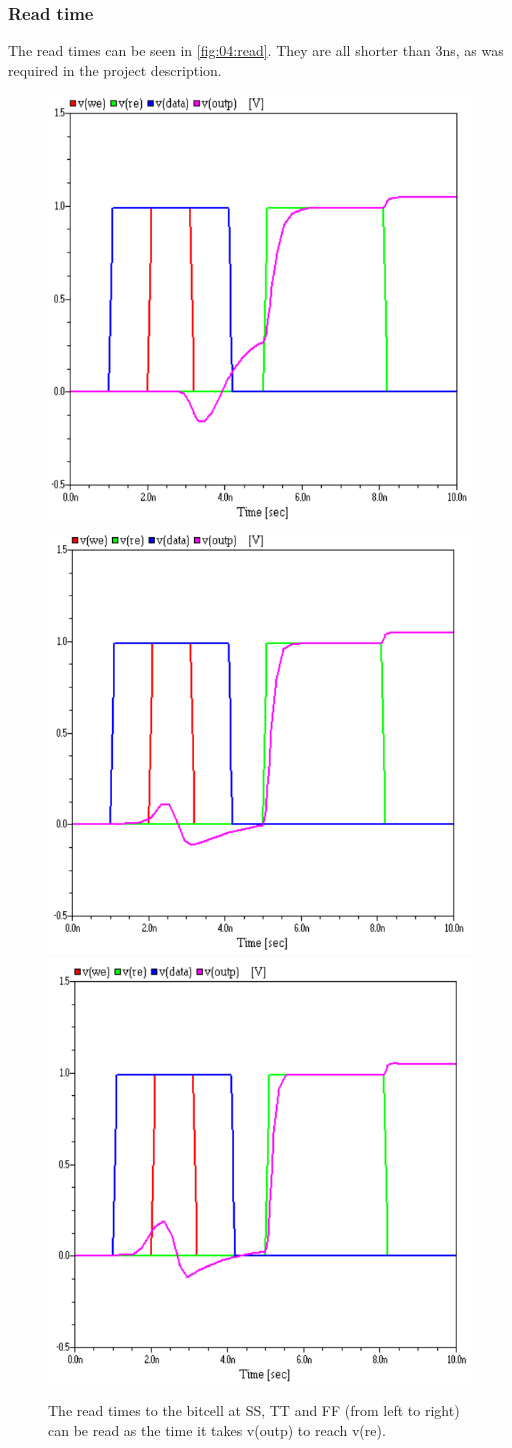 \subsubsection{Read time}
The read times can be seen in \autoref{fig:04:read}. They are all shorter than 3ns, as was required in the project description.
\begin{figure}[H]
    \centering
    \includegraphics[width=0.3\linewidth]{aimSpice/plots/plotsSS/read.png}
    \includegraphics[width=0.3\linewidth]{aimSpice/plots/plotsTT/read.png}
    \includegraphics[width=0.3\linewidth]{aimSpice/plots/plotsFF/read.png}
    \caption{The read times to the bitcell at SS, TT and FF (from left to right) can be read as the time it takes v(outp) to reach v(re).}
    \label{fig:04:read}
\end{figure}

